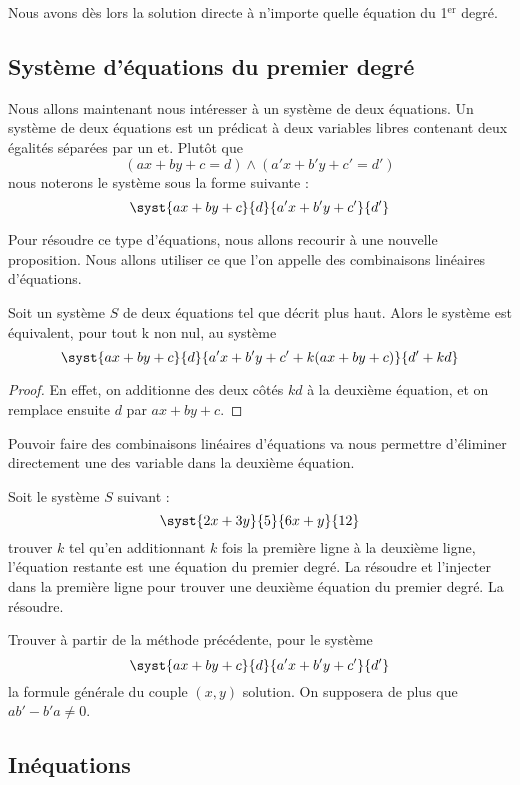 Nous avons dès lors la solution directe à n'importe quelle équation du 1$^{\mathrm{er}}$ degré.

\subsection{Système d'équations du premier degré}

Nous allons maintenant nous intéresser à un système de deux équations. Un système de deux équations est un prédicat à deux variables libres contenant deux égalités séparées par un \og et\fg{}. Plutôt que $$(ax+by+c=d)\land (a'x+b'y+c'=d')$$ nous noterons le système sous la forme suivante : $$\syst{ax+by+c}{d}{a'x+b'y+c'}{d'}$$

Pour résoudre ce type d'équations, nous allons recourir à une nouvelle proposition. Nous allons utiliser ce que l'on appelle des combinaisons linéaires d'équations.

\begin{prop}
    Soit un système $S$ de deux équations tel que décrit plus haut. Alors le système est équivalent, pour tout k non nul, au système 
    $$ \syst{ax+by+c}{d}{a'x+b'y+c'+k(ax+by+c)}{d'+kd}$$
\end{prop}
\begin{proof}
    En effet, on additionne des deux côtés $kd$ à la deuxième équation, et on remplace ensuite $d$ par $ax+by+c$.
\end{proof}

Pouvoir faire des combinaisons linéaires d'équations va nous permettre d'éliminer directement une des variable dans la deuxième équation.

\begin{exo}
    Soit le système $S$ suivant :
    $$\syst{2x+3y}{5}{6x+y}{12}$$
    trouver $k$ tel qu'en additionnant $k$ fois la première ligne à la deuxième ligne, l'équation restante est une équation du premier degré. La résoudre et l'injecter dans la première ligne pour trouver une deuxième équation du premier degré. La résoudre.
\end{exo}

\begin{exo}
    Trouver à partir de la méthode précédente, pour le système $$\syst{ax+by+c}{d}{a'x+b'y+c'}{d'}$$ la formule générale du couple $(x,y)$ solution. On supposera de plus que $ab'-b'a\neq 0$.
\end{exo}

\subsection{Inéquations}

